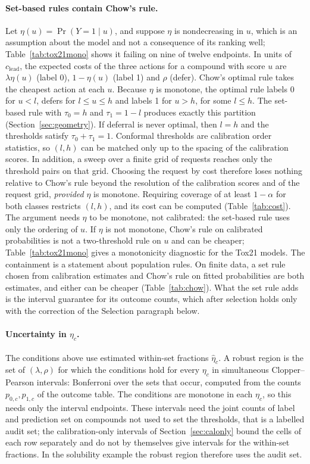 \documentclass[10pt]{article}
\begin{document}
\paragraph{Set-based rules contain Chow's rule.} Let $\eta(u)=\Pr(Y=1\mid u)$, and suppose $\eta$ is nondecreasing in $u$, which is an assumption about the model and not a consequence of its ranking well; Table~\ref{tab:tox21mono} shows it failing on nine of twelve endpoints. In units of $c_{\text{lead}}$, the expected costs of the three actions for a compound with score $u$ are $\lambda\eta(u)$ (label 0), $1-\eta(u)$ (label 1) and $\rho$ (defer). Chow's optimal rule\citep{Chow1970} takes the cheapest action at each $u$. Because $\eta$ is monotone, the optimal rule labels 0 for $u<l$, defers for $l\le u\le h$ and labels 1 for $u>h$, for some $l\le h$. The set-based rule with $\tau_0=h$ and $\tau_1=1-l$ produces exactly this partition (Section~\ref{sec:geometry}). If deferral is never optimal, then $l=h$ and the thresholds satisfy $\tau_0+\tau_1=1$. Conformal thresholds are calibration order statistics, so $(l,h)$ can be matched only up to the spacing of the calibration scores. In addition, a sweep over a finite grid of requests reaches only the threshold pairs on that grid. Choosing the request by cost therefore loses nothing relative to Chow's rule beyond the resolution of the calibration scores and of the request grid, \emph{provided} $\eta$ is monotone. Requiring coverage of at least $1-\alpha$ for both classes restricts $(l,h)$, and its cost can be computed (Table~\ref{tab:cost}). The argument needs $\eta$ to be monotone, not calibrated: the set-based rule uses only the ordering of $u$. If $\eta$ is not monotone, Chow's rule on calibrated probabilities is not a two-threshold rule on $u$ and can be cheaper; Table~\ref{tab:tox21mono} gives a monotonicity diagnostic for the Tox21 models. The containment is a statement about population rules. On finite data, a set rule chosen from calibration estimates and Chow's rule on fitted probabilities are both estimates, and either can be cheaper (Table~\ref{tab:chow}). What the set rule adds is the interval guarantee for its outcome counts, which after selection holds only with the correction of the Selection paragraph below.

\paragraph{Uncertainty in $\eta_c$.} The conditions above use estimated within-set fractions $\hat\eta_c$. A robust region is the set of $(\lambda,\rho)$ for which the conditions hold for every $\eta_c$ in simultaneous Clopper--Pearson intervals: Bonferroni over the sets that occur, computed from the counts $p_{0,c},p_{1,c}$ of the outcome table. The conditions are monotone in each $\eta_c$, so this needs only the interval endpoints. These intervals need the joint counts of label and prediction set on compounds not used to set the thresholds, that is a labelled audit set; the calibration-only intervals of Section~\ref{sec:calonly} bound the cells of each row separately and do not by themselves give intervals for the within-set fractions. In the solubility example the robust region therefore uses the audit set.
\end{document}
